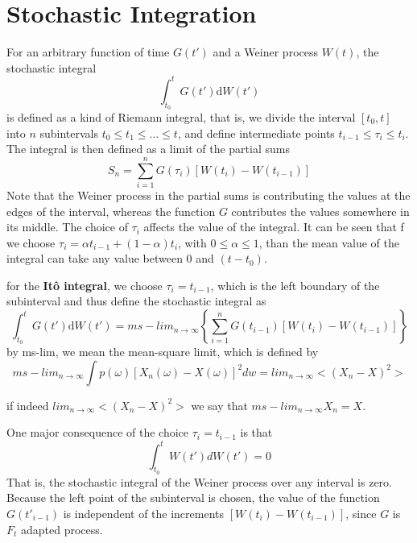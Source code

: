 \documentclass[12pt]{report}
\begin{document}
\section{Stochastic Integration}
For an arbitrary function of time $G(t')$ and a Weiner process $W(t)$, the stochastic integral 
\begin{equation*}
\int_{t_0}^t G(t')\mathrm{d}W(t')
\end{equation*}
is defined as a kind of Riemann integral, that is, we divide the interval $[t_0,t]$ into $n$ subintervals $t_0\leq t_1\leq ...\leq t$, and define intermediate points $t_{i-1}\leq\tau_i\leq t_{i}$. The integral is then defined as a limit of the partial sums 
\begin{equation*}
S_n=\sum_{i=1}^nG(\tau_i)[W(t_i)-W(t_{i-1})]
\end{equation*}
Note that the Weiner process in the partial sums is contributing the values at the edges of the interval, whereas the function $G$ contributes the values somewhere in its middle.
The choice of $\tau_i$ affects the value of the integral. It can be seen that f we choose $\tau_i=\alpha t_{i-1}+(1-\alpha)t_i$, with $0\leq \alpha\leq 1$,  than the mean value of the integral can take any value between 0 and $(t-t_0)$. 

for the \textbf{It\^{o} integral}, we choose $\tau_i=t_{i-1}$, which is the left boundary of the subinterval and thus define the stochastic integral as
\begin{equation*}
\int_{t_0}^{t}G(t')\mathrm{d}W(t')=ms-lim_{n\rightarrow\infty}\left\{\sum_{i=1}^nG(t_{i-1})[W(t_{i})-W(t_{i-1})] \right\}
\end{equation*}
by ms-lim, we mean the mean-square limit, which is defined by 
\begin{equation*}
ms-lim_{n\rightarrow\infty}\int p(\omega)[X_n(\omega)-X(\omega)]^2dw= lim_{n\rightarrow \infty}<(X_n-X)^2>
\end{equation*}

if indeed $lim_{n\rightarrow \infty}<(X_n-X)^2>$ we say that $ms-lim_{n\rightarrow \infty} X_n=X$.

One major consequence of the choice $\tau_i=t_{i-1}$ is that 
\begin{equation*}
\int_{t_0}^{t}W(t')dW(t')=0
\end{equation*}
That is, the stochastic integral of the Weiner process over any interval is zero.
Because the left point of the subinterval is chosen, the value of the function $G(t'_{i-1})$ is independent of the increments $[W(t_i)-W(t_{i-1})]$, since $G$ is $F_t$ adapted process.
\end{document}

